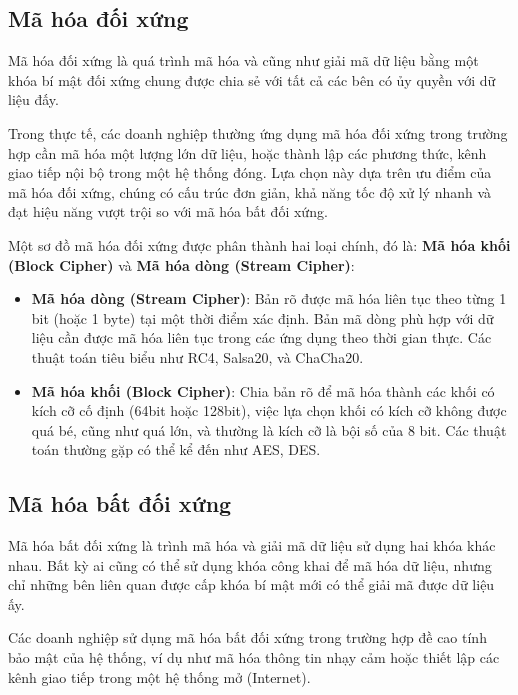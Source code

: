 \subsection{Mã hóa đối xứng}

Mã hóa đối xứng là quá trình mã hóa và cũng như giải mã dữ liệu bằng một khóa bí mật đối xứng chung được chia sẻ với tất cả các bên có ủy quyền với dữ liệu đấy.

Trong thực tế, các doanh nghiệp thường ứng dụng mã hóa đối xứng trong trường hợp cần mã hóa một lượng lớn dữ liệu, hoặc thành lập các phương thức, kênh giao tiếp nội bộ trong một hệ thống đóng. Lựa chọn này dựa trên ưu điểm của mã hóa đối xứng, chúng có cấu trúc đơn giản, khả năng tốc độ xử lý nhanh và đạt hiệu năng vượt trội so với mã hóa bất đối xứng. \nocite{badman_kosinski_2024}

Một sơ đồ mã hóa đối xứng được phân thành hai loại chính, đó là: \textbf{Mã hóa khối (Block Cipher)} và \textbf{Mã hóa dòng (Stream Cipher)}:
\begin{itemize}
	\item \textbf{Mã hóa dòng (Stream Cipher)}: Bản rõ được mã hóa liên tục theo từng 1 bit (hoặc 1 byte) tại một thời điểm xác định. Bản mã dòng phù hợp với dữ liệu cần được mã hóa liên tục trong các ứng dụng theo thời gian thực. Các thuật toán tiêu biểu như RC4, Salsa20, và ChaCha20. \nocite{geeksforgeeks_2025}
	\item \textbf{Mã hóa khối (Block Cipher)}: Chia bản rõ để mã hóa thành các khối có kích cỡ cố định (64bit hoặc 128bit), việc lựa chọn khối có kích cỡ không được quá bé, cũng như quá lớn, và thường là kích cỡ là bội số của 8 bit. Các thuật toán thường gặp có thể kể đến như AES, DES. \nocite{geeksforgeeks_2025}

\end{itemize}

\subsection{Mã hóa bất đối xứng}
Mã hóa bất đối xứng là trình mã hóa và giải mã dữ liệu sử dụng hai khóa khác nhau. Bất kỳ ai cũng có thể sử dụng khóa công khai để mã hóa dữ liệu, nhưng chỉ những bên liên quan được cấp khóa bí mật mới có thể giải mã được dữ liệu ấy. 

Các doanh nghiệp sử dụng mã hóa bất đối xứng trong trường hợp đề cao tính bảo mật của hệ thống, ví dụ như mã hóa thông tin nhạy cảm hoặc thiết lập các kênh giao tiếp trong một hệ thống mở (Internet). \nocite{ibm_2024}

